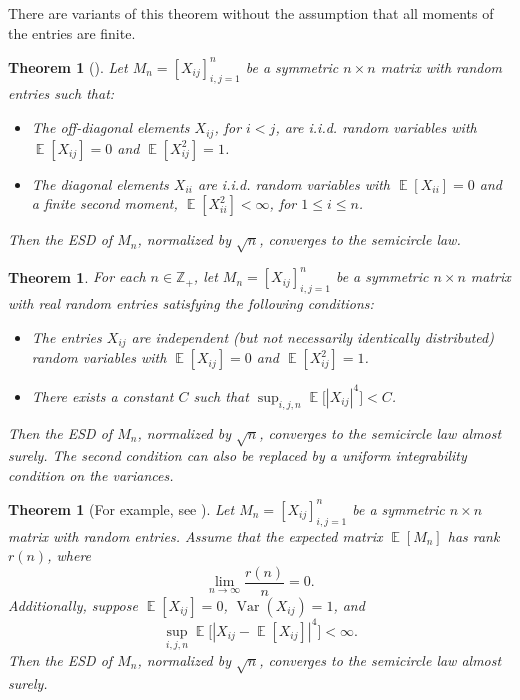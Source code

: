 \documentclass[letterpaper,11pt,oneside,reqno]{book}
\numberwithin{equation}{chapter}  %
\newtheorem{theorem}[proposition]{Theorem}
\theoremstyle{definition}
\begin{document}
There are variants of this theorem without the assumption
that all moments of the entries are finite.
\begin{theorem}[\cite{benaych-georges2016lectures}]
	\label{lecture2:thm:benaych-georges}
Let $M_n = [X_{ij}]_{i,j=1}^n$ be a symmetric $n \times n$ matrix with random entries such that:
\begin{itemize}
				\item The off-diagonal elements $X_{ij}$, for $i < j$, are i.i.d. random variables with $\operatorname{\mathbb{E}}[X_{ij}] = 0$ and $\operatorname{\mathbb{E}}[X_{ij}^2] = 1$.
				\item The diagonal elements $X_{ii}$ are i.i.d. random variables with $\operatorname{\mathbb{E}}[X_{ii}] = 0$ and a finite second moment, $\operatorname{\mathbb{E}}[X_{ii}^2] < \infty$, for $1 \leq i \leq n$.
\end{itemize}
Then the ESD of $M_n$, normalized by $\sqrt{n}$, converges to the semicircle law.
\end{theorem}

\begin{theorem}
For each $n \in \mathbb{Z}_+$, let $M_n = [X_{ij}]_{i,j=1}^n$ be a symmetric $n \times n$ matrix with real random entries satisfying the following conditions:
\begin{itemize}
				\item The entries $X_{ij}$ are independent
	(but not necessarily identically distributed) random variables
					with $\operatorname{\mathbb{E}}[X_{ij}] = 0$ and $\operatorname{\mathbb{E}}[X_{ij}^2] = 1$.
				\item There exists a constant $C$ such that $\sup_{i,j,n} \operatorname{\mathbb{E}}\big[|X_{ij}|^4\big] < C$.
\end{itemize}
Then the ESD of $M_n$, normalized by $\sqrt{n}$, converges to the semicircle law almost surely. The second condition can also be replaced by a uniform integrability condition on the variances.
\end{theorem}

\begin{theorem}[For example, see \cite{silverstein1995empirical}]
Let $M_n = [X_{ij}]_{i,j=1}^n$ be a symmetric $n \times n$ matrix with random entries. Assume that the expected matrix $\operatorname{\mathbb{E}}[M_n]$ has rank $r(n)$, where
\[
\lim_{n \to \infty} \frac{r(n)}{n} = 0.
\]
Additionally, suppose $\operatorname{\mathbb{E}}[X_{ij}] = 0$, $\operatorname{\mathrm{Var}}(X_{ij}) = 1$, and
\[
\sup_{i,j,n} \operatorname{\mathbb{E}}\big[|X_{ij} - \operatorname{\mathbb{E}}[X_{ij}]|^4\big] < \infty.
\]
Then the ESD of $M_n$, normalized by $\sqrt{n}$, converges to the semicircle law almost surely.
\end{theorem}
\end{document}
